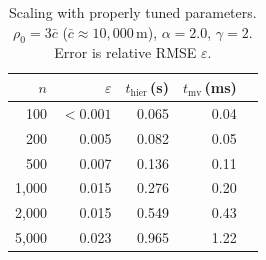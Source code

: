 \begin{table}[t]
\centering
\caption{Scaling with properly tuned parameters.
  $\rho_0 = 3\bar{c}$ ($\bar{c} \approx 10{,}000$\,m),
  $\alpha = 2.0$, $\gamma = 2$.
  Error is relative RMSE $\varepsilon$.}
\label{tab:scaling-tuned}
\begin{tabular}{rrrrr}
\toprule
$n$ & $\varepsilon$ & $t_{\mathrm{hier}}$\,(s) & $t_{\mathrm{mv}}$\,(ms) \\
\midrule
    100 & $< 0.001$ & 0.065 & 0.04 \\
    200 &    0.005  & 0.082 & 0.05 \\
    500 &    0.007  & 0.136 & 0.11 \\
1{,}000 &    0.015  & 0.276 & 0.20 \\
2{,}000 &    0.015  & 0.549 & 0.43 \\
5{,}000 &    0.023  & 0.965 & 1.22 \\
\bottomrule
\end{tabular}
\end{table}
